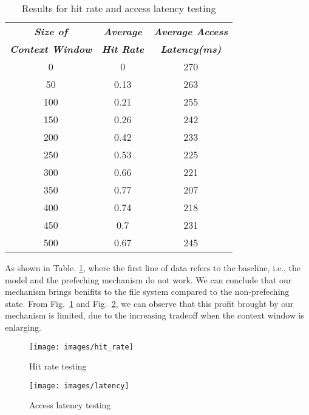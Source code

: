\documentclass[conference]{IEEEtran}
\begin{document}
\begin{table}[htbp]
    \caption{Results for hit rate and access latency testing} 
\begin{center}
    \begin{tabular}{ |c|c|c| } 
     \hline
     \textbf{\textit{Size of}}&\textbf{\textit{Average}} &\textbf{\textit{Average Access}}\\ 
     \textbf{\textit{Context Window}}& \textbf{\textit{Hit Rate}} & \textbf{\textit{Latency(ms)}}\\
     \hline
     \hline
     0	&0	&270\\
     \hline
     50	&0.13	&263\\
     \hline
     100	&0.21	&255\\
     \hline
     150	&0.26	&242\\
     \hline
     200	&0.42	&233\\
     \hline
     250	&0.53	&225\\
     \hline
     300	&0.66	&221\\
     \hline
     350	&0.77	&207\\
     \hline
     400	&0.74	&218\\
     \hline
     450	&0.7	&231\\
     \hline
     500	&0.67	&245\\
     \hline
    \end{tabular}
\end{center}

    \label{table:result}
\end{table}
As shown in Table. \ref{table:result}, where the first line of data refers to the baseline, i.e., the model and the prefeching mechanism do not work.
We can conclude that our mechanism brings benifits to the file system compared to the non-prefeching state.
From Fig.~\ref{fig:hit_rate} and Fig.~\ref{fig:latency}, we can observe that this profit brought by our mechanism is limited, 
due to the increasing tradeoff when the context window is enlarging.
\begin{figure}
\centering
\texttt{[image: images/hit\_rate]}
\caption{Hit rate testing}
\label{fig:hit_rate}
\end{figure}

\begin{figure}
\centering
\texttt{[image: images/latency]}
\caption{Access latency testing}
\label{fig:latency}
\end{figure}
\end{document}
